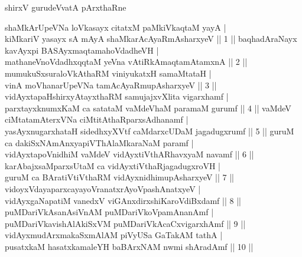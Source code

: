 \thispagestyle{empty}
\centerline{\large shirxV gurudeVvatA pArxthaRne}
\vfill\noindent
\noindent
shaMkArUpeVNa loVkasayx citatxM paMkiVkaqtaM yayA |\\
kiMkariV yasayx sA mAyA shaMkarAcAyaRmAsharxyeV || 1 ||
\vfill\noindent
baqhadAraNayx kavAyxpi BASAyxmaqtamahoVdadheVH |\\
mathaneVnoVdadhxqqtaM yeVna vAtiRkAmaqtamAtamxnA || 2 ||
\vfill\noindent
mumukuSxsuraloVkAthaRM viniyukatxH samaMtataH |\\
vinA moVhanarUpeVNa tamAcAyaRmupAsharxyeV || 3 ||
\vfill\noindent
vidAyxtapaHshirxyAtayxthaRM samujajxvXlita vigarxhamf |\\
parxtayxknumxKaM ca satataM vaMdeV\s haM paramaM gurumf || 4 ||
\vfill\noindent
vaMdeV ciMtatamAterxVNa ciMtitAthaRparxsAdhanamf |\\
yasAyxnugarxhataH sidedhxyXVtf caMdarxcUDaM jagadugxrumf || 5 ||
\vfill\noindent
guruM ca dakiSxNAmAnxyapiVThAlaMkaraNaM paramf |\\
vidAyxtapoVnidhiM vaMdeV vidAyxtiVthARhavxyaM navamf || 6 ||
\vfill\noindent
karAbajxsaMparxsUtaM ca vidAyxtiVthaRjagadugxroVH |\\
guruM ca BAratiVtiVthaRM vidAyxnidhimupAsharxyeV || 7 ||
\vfill\noindent
vidoyxVdayaparxcayayoVranatxrAyoVpashAnatxyeV |\\
vidAyxgaNapatiM vanedxV viGAnxdirxshiKaroVdiBxdamf || 8 ||
\vfill\noindent
puMDariVkAsanAsiVnAM puMDariVkoVpamAnanAmf |\\
puMDariVkavishAlAkiSxVM puMDariVkAcaCxvigarxhAmf || 9 ||
\vfill\noindent
vidAyxmudArxmakaSxmAlAM piVyUSa GaTakAM tathA |\\
pusatxkaM hasatxkamaleYH baBArxNAM nwmi shAradAmf || 10 ||
